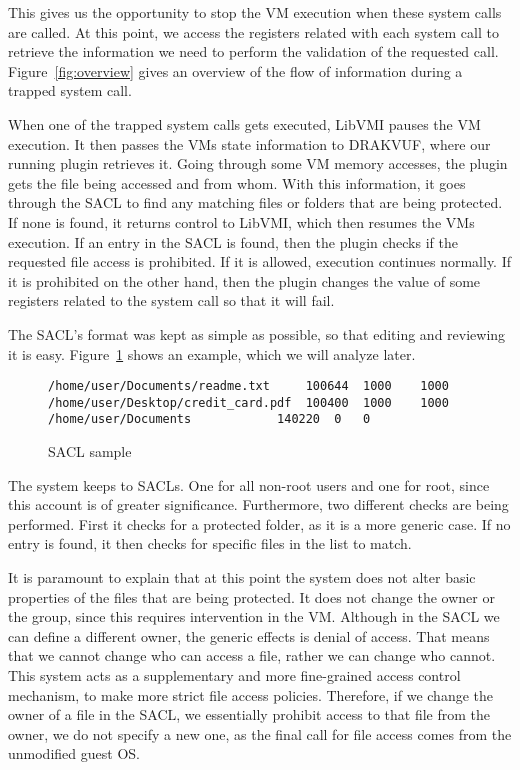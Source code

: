 This gives us the opportunity to stop the \ac{VM} execution when these system calls are called. At this point, we access the registers related with each system call to retrieve the information we need to perform the validation of the requested call. Figure~\ref{fig:overview} gives an overview of the flow of information during a trapped system call. 

\par When one of the trapped system calls gets executed, LibVMI pauses the \ac{VM} execution. It then passes the \ac{VM}s state information to DRAKVUF, where our running plugin retrieves it. Going through some \ac{VM} memory accesses, the plugin gets the file being accessed and from whom. With this information, it goes through the \ac{SACL} to find any matching files or folders that are being protected. If none is found, it returns control to LibVMI, which then resumes the \ac{VM}s execution. If an entry in the \ac{SACL} is found, then the plugin checks if the requested file access is prohibited. If it is allowed, execution continues normally. If it is prohibited on the other hand, then the plugin changes the value of some registers related to the system call so that it will fail.

\par The \ac{SACL}'s format was kept as simple as possible, so that editing and reviewing it is easy. Figure~\ref{fig:sacl} shows an example, which we will analyze later.

\begin{figure}[ht]
	\centering
	\begin{lstlisting}
/home/user/Documents/readme.txt		100644	1000	1000
/home/user/Desktop/credit_card.pdf	100400	1000	1000
/home/user/Documents			140220	0	0
	\end{lstlisting}
	\caption{\ac{SACL} sample}
	\label{fig:sacl}
\end{figure}

\par The system keeps to \ac{SACL}s. One for all non-root users and one for root, since this account is of greater significance. Furthermore, two different checks are being performed. First it checks for a protected folder, as it is a more generic case. If no entry is found, it then checks for specific files in the list to match.

\par It is paramount to explain that at this point the system does not alter basic properties of the files that are being protected. It does not change the owner or the group, since this requires intervention in the \ac{VM}. Although in the \ac{SACL} we can define a different owner, the generic effects is denial of access. That means that we cannot change who can access a file, rather we can change who cannot. This system acts as a supplementary and more fine-grained access control mechanism, to make more strict file access policies. Therefore, if we change the owner of a file in the \ac{SACL}, we essentially prohibit access to that file from the owner, we do not specify a new one, as the final call for file access comes from the unmodified guest \ac{OS}.

